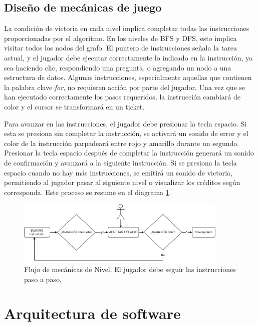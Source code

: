 \subsection{Diseño de mecánicas de juego}

La condición de victoria en cada nivel implica completar todas las instrucciones proporcionadas por el algoritmo. En los niveles de BFS y DFS, esto implica visitar todos los nodos del grafo. El puntero de instrucciones señala la tarea actual, y el jugador debe ejecutar correctamente lo indicado en la instrucción, ya sea haciendo clic, respondiendo una pregunta, o agregando un nodo a una estructura de datos. Algunas instrucciones, especialmente aquellas que contienen la palabra clave \textit{for}, no requieren acción por parte del jugador. Una vez que se han ejecutado correctamente los pasos requeridos, la instrucción cambiará de color y el cursor se transformará en un ticket.

Para avanzar en las instrucciones, el jugador debe presionar la tecla espacio. Si esta se presiona sin completar la instrucción, se activará un sonido de error y el color de la instrucción parpadeará entre rojo y amarillo durante un segundo. Presionar la tecla espacio después de completar la instrucción generará un sonido de confirmación y avanzará a la siguiente instrucción. Si se presiona la tecla espacio cuando no hay más instrucciones, se emitirá un sonido de victoria, permitiendo al jugador pasar al siguiente nivel o visualizar los créditos según corresponda. Este proceso se resume en el diagrama \ref{FlujoMecanicaDeNivel}.

\begin{figure}[h]
	\centering
	\includegraphics[width=0.9\textwidth]{imagenes/FlujoDeMecanicasDeNivel.drawio.png}
	\caption{Flujo de mecánicas de Nivel. El jugador debe seguir las instrucciones paso a paso.}
	\label{FlujoMecanicaDeNivel}
\end{figure}



\section{Arquitectura de software}

